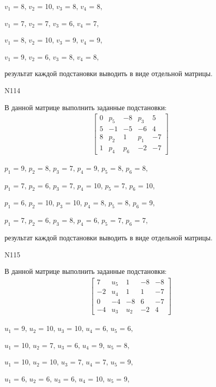 \documentclass[11pt]{report}
\begin{document}
$v_{1}$ = 8, $v_{2}$ = 10, $v_{3}$ = 8, $v_{4}$ = 8, 

$v_{1}$ = 7, $v_{2}$ = 7, $v_{3}$ = 6, $v_{4}$ = 7, 

$v_{1}$ = 8, $v_{2}$ = 10, $v_{3}$ = 9, $v_{4}$ = 9, 

$v_{1}$ = 9, $v_{2}$ = 6, $v_{3}$ = 8, $v_{4}$ = 8, 

результат каждой подстановки выводить в виде отдельной матрицы.

N114

В данной матрице выполнить заданные подстановки:
\begin{align*}
\left[\begin{matrix}0 & p_{5} & -8 & p_{3} & 5\\5 & -1 & -5 & -6 & 4\\8 & p_{2} & 1 & p_{1} & -7\\1 & p_{4} & p_{6} & -2 & -7\end{matrix}\right]
\end{align*}


$p_{1}$ = 9, $p_{2}$ = 8, $p_{3}$ = 7, $p_{4}$ = 9, $p_{5}$ = 8, $p_{6}$ = 8, 

$p_{1}$ = 7, $p_{2}$ = 6, $p_{3}$ = 7, $p_{4}$ = 10, $p_{5}$ = 7, $p_{6}$ = 10, 

$p_{1}$ = 6, $p_{2}$ = 10, $p_{3}$ = 10, $p_{4}$ = 8, $p_{5}$ = 8, $p_{6}$ = 9, 

$p_{1}$ = 7, $p_{2}$ = 6, $p_{3}$ = 8, $p_{4}$ = 6, $p_{5}$ = 7, $p_{6}$ = 7, 

результат каждой подстановки выводить в виде отдельной матрицы.

N115

В данной матрице выполнить заданные подстановки:
\begin{align*}
\left[\begin{matrix}7 & u_{5} & 1 & -8 & -8\\-2 & u_{4} & 1 & 1 & -7\\0 & -4 & -8 & 6 & -7\\-4 & u_{3} & u_{2} & -2 & 4\end{matrix}\right]
\end{align*}


$u_{1}$ = 9, $u_{2}$ = 10, $u_{3}$ = 10, $u_{4}$ = 6, $u_{5}$ = 6, 

$u_{1}$ = 10, $u_{2}$ = 7, $u_{3}$ = 6, $u_{4}$ = 9, $u_{5}$ = 8, 

$u_{1}$ = 10, $u_{2}$ = 10, $u_{3}$ = 7, $u_{4}$ = 7, $u_{5}$ = 9, 

$u_{1}$ = 6, $u_{2}$ = 6, $u_{3}$ = 6, $u_{4}$ = 10, $u_{5}$ = 9, 
\end{document}
